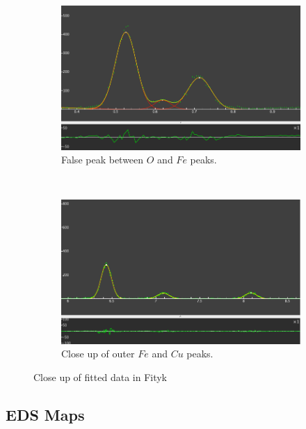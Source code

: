 \documentclass[12pt,a4paper]{article}
\begin{document}
\begin{figure}[htbp]
  \centering
    \begin{subfigure}[b]{0.45\textwidth}
    \includegraphics[width=\textwidth]{Data/crossover.png}
    \caption{False peak between $O$ and $Fe$ peaks.}
    \label{fig:cross}
  \end{subfigure}
  ~
  \begin{subfigure}[b]{0.45\textwidth}
    \includegraphics[width=\textwidth]{Data/outer_peak.png}
    \caption{Close up of outer $Fe$ and $Cu$ peaks.}
    \label{fig:outer}
  \end{subfigure}%
  \caption{Close up of fitted data in Fityk}
  \label{fig:fit}
\end{figure}


\subsection{EDS Maps} %
\label{sub:eds_maps}
\end{document}
